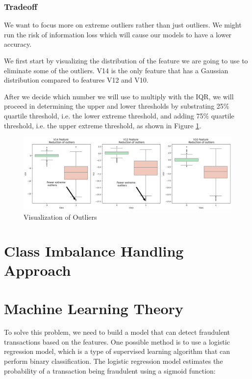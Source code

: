 \subsubsection*{Tradeoff}

We want to focus more on extreme outliers rather than just outliers. We might run the risk of information loss which will cause our models to have a lower accuracy. 

 We first start by visualizing the distribution of the feature we are going to use to eliminate some of the outliers. V14 is the only feature that has a Gaussian distribution compared to features V12 and V10.
 
 After we decide which number we will use to multiply with the IQR, we will proceed in determining the upper and lower thresholds by substrating 25\% quartile threshold, i.e. the lower extreme threshold, and adding 75\% quartile threshold, i.e. the upper extreme threshold, as shown in Figure \ref{fig:vis_outliers}.

\begin{figure}[htbp]
	\centering
	\includegraphics[width=0.7\linewidth]{../output10}
	\caption{Visualization of Outliers}
	\label{fig:vis_outliers}
\end{figure}


\section{Class Imbalance Handling Approach}
\label{sec:imbalance}


\section{Machine Learning Theory}
\label{sec:machine}

To solve this problem, we need to build a model that can detect fraudulent transactions based on the features. One possible method is to use a logistic regression model, which is a type of supervised learning algorithm that can perform binary classification. The logistic regression model estimates the probability of a transaction being fraudulent using a sigmoid function:


